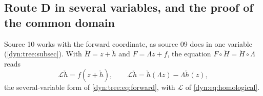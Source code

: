 \documentclass[11pt,letterpaper]{article}
\theoremstyle{definition}
\theoremstyle{remark}
\newcommand{\Li}{\mathcal L}
\numberwithin{equation}{section}
\begin{document}
\subsection{Route D in several variables, and the proof of the common domain}
\label{dyn:nsc:subsec:proof}

Source 10 works with the forward coordinate, as source 09 does in one
variable (\cref{dyn:tree:subsec}). With $\check H=z+\check h$ and
$F=\Lambda z+f$, the equation $F\circ\check H=\check H\circ\Lambda$ reads
\begin{equation}\label{dyn:nsc:eq:forward}
 \Li\check h=f(z+\check h),\qquad \Li\check h=\check h(\Lambda z)-\Lambda\check h(z),
\end{equation}
the several-variable form of \eqref{dyn:tree:eq:forward}, with $\Li$ of
\eqref{dyn:eq:homological}.
\end{document}
